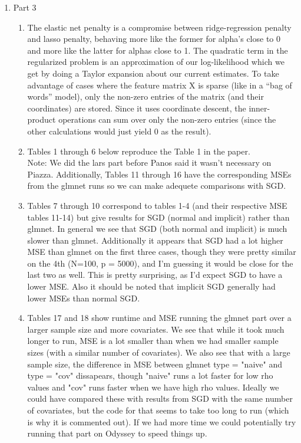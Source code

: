 \documentclass[paper=a4, fontsize=11pt]{scrartcl}
\begin{document}
\begin{enumerate}
\begin{enumerate}[(a)]
    \end{enumerate}
   \item Part 3
   \begin{enumerate}[(a.)]
   \item
   The elastic net penalty is a compromise between ridge-regression penalty and lasso penalty, behaving more like the former for alpha’s close to 0 and more like the latter for alphas close to 1. The quadratic term in the regularized problem is an approximation of our log-likelihood which we get by doing  a Taylor expansion about our current estimates. To take advantage of cases where the feature matrix X is sparse (like in a “bag of words” model), only the non-zero entries of the matrix (and their coordinates) are stored. Since it uses coordinate descent, the inner-product operations can sum over only the non-zero entries (since the other calculations would just yield 0 as the result).
   \item Tables 1 through 6 below reproduce the Table 1 in the paper.\\ Note: We did the lars part before Panos said it wasn't necessary on Piazza. Additionally, Tables 11 through 16 have the corresponding MSEs from the glmnet runs so we can make adequete comparisons with SGD.
   \item Tables 7 through 10 correspond to tables 1-4 (and their respective MSE tables 11-14) but give results for SGD (normal and implicit) rather than glmnet. In general we see that SGD (both normal and implicit) is much slower than glmnet. Additionally it appears that SGD had a lot higher MSE than glmnet on the first three cases, though they were pretty similar on the 4th (N=100, p = 5000), and I'm guessing it would be close for the last two as well. This is pretty surprising, as I'd expect SGD to have a lower MSE. Also it should be noted that implicit SGD generally had lower MSEs than normal SGD.
   \item Tables 17 and 18 show runtime and MSE running the glmnet part over a larger sample size and more covariates. We see that while it took much longer to run, MSE is a lot smaller than when we had smaller sample sizes (with a similar number of covariates). We also see that with a large sample size, the difference in MSE between glmnet type = "naive" and type = "cov" dissapears, though "naive" runs a lot faster for low rho values and "cov" runs faster when we have high rho values. Ideally we could have compared these with results from SGD with the same number of covariates, but the code for that seems to take too long to run (which is why it is commented out). If we had more time we could potentially try running that part on Odyssey to speed things up.

\end{enumerate}
\end{enumerate}
\end{document}
